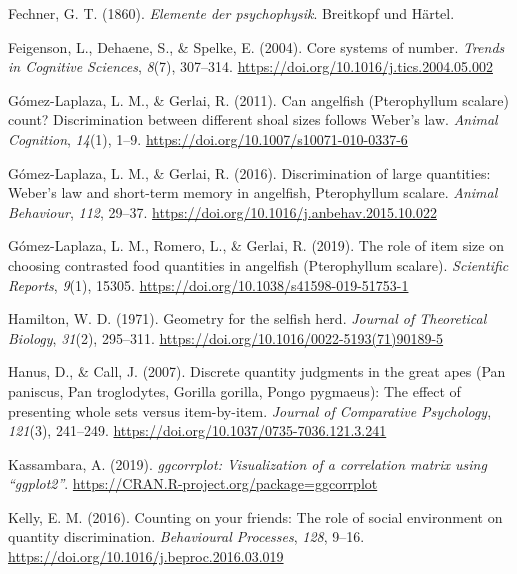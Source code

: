 \documentclass[
  ,pub,floatsintext]{apa6}
\newlength{\cslhangindent}
\newlength{\cslentryspacingunit} %
\newenvironment{CSLReferences}[2] %
 {%
  \setlength{\parindent}{0pt}
  \ifodd #1
  \let\oldpar\par
  \def\par{\hangindent=\cslhangindent\oldpar}
  \fi
  \setlength{\parskip}{#2\cslentryspacingunit}
 }%
 {}
\begin{document}
\begin{CSLReferences}{1}{0}
\leavevmode{}%
Fechner, G. T. (1860). \emph{Elemente der psychophysik}. Breitkopf und Härtel.

\leavevmode{}%
Feigenson, L., Dehaene, S., \& Spelke, E. (2004). Core systems of number. \emph{Trends in Cognitive Sciences}, \emph{8}(7), 307--314. \url{https://doi.org/10.1016/j.tics.2004.05.002}

\leavevmode{}%
Gómez-Laplaza, L. M., \& Gerlai, R. (2011). Can angelfish ({Pterophyllum} scalare) count? {Discrimination} between different shoal sizes follows {Weber}'s law. \emph{Animal Cognition}, \emph{14}(1), 1--9. \url{https://doi.org/10.1007/s10071-010-0337-6}

\leavevmode{}%
Gómez-Laplaza, L. M., \& Gerlai, R. (2016). Discrimination of large quantities: {Weber}'s law and short-term memory in angelfish, {Pterophyllum} scalare. \emph{Animal Behaviour}, \emph{112}, 29--37. \url{https://doi.org/10.1016/j.anbehav.2015.10.022}

\leavevmode{}%
Gómez-Laplaza, L. M., Romero, L., \& Gerlai, R. (2019). The role of item size on choosing contrasted food quantities in angelfish ({Pterophyllum} scalare). \emph{Scientific Reports}, \emph{9}(1), 15305. \url{https://doi.org/10.1038/s41598-019-51753-1}

\leavevmode{}%
Hamilton, W. D. (1971). Geometry for the selfish herd. \emph{Journal of Theoretical Biology}, \emph{31}(2), 295--311. \url{https://doi.org/10.1016/0022-5193(71)90189-5}

\leavevmode{}%
Hanus, D., \& Call, J. (2007). Discrete quantity judgments in the great apes ({Pan} paniscus, {Pan} troglodytes, {Gorilla} gorilla, {Pongo} pygmaeus): {The} effect of presenting whole sets versus item-by-item. \emph{Journal of Comparative Psychology}, \emph{121}(3), 241--249. \url{https://doi.org/10.1037/0735-7036.121.3.241}

\leavevmode{}%
Kassambara, A. (2019). \emph{{ggcorrplot}: Visualization of a correlation matrix using {``ggplot2''}}. \url{https://CRAN.R-project.org/package=ggcorrplot}

\leavevmode{}%
Kelly, E. M. (2016). Counting on your friends: {The} role of social environment on quantity discrimination. \emph{Behavioural Processes}, \emph{128}, 9--16. \url{https://doi.org/10.1016/j.beproc.2016.03.019}


\end{CSLReferences}
\end{document}
